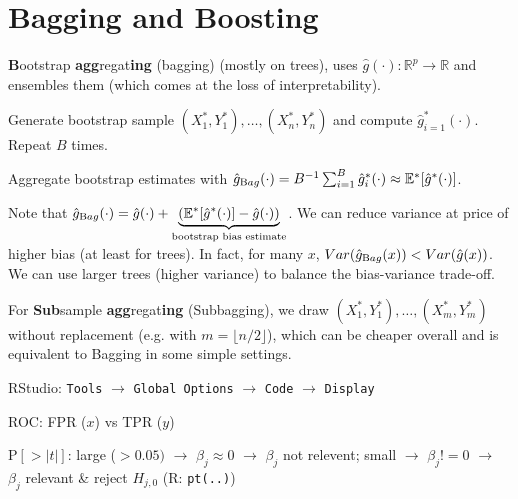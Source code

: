 \section{ Bagging and Boosting}\label{sec:bagging_and_boosting}
\begin{sectionbox}\nospacing{}
  \textbf{B}ootstrap \textbf{agg}regat\textbf{ing} (bagging) (mostly on trees), uses $\hat g(\cdot): \mathbb{R}^{p}\to \mathbb{R}$ and ensembles them (which comes at the loss of interpretability).
  \begin{enumeratenosep}[label=\roman*]
    \item Generate bootstrap sample $(X_{1}^{\ast}, Y_{1}^{\ast}), \dots, (X_{n}^{\ast}, Y_{n}^{\ast})$ and compute $\hat{g}^{\ast}_{i=1}(\cdot)$. Repeat $B$ times.
    \item Aggregate bootstrap estimates with $\hat{g}_{\textrm Bag}(\cdot) = B^{-1}\sum_{i=1}^{B} \hat{g}^{\ast}_{i}(\cdot) \approx \mathbb{E}^{\ast}[\hat{g}^{\ast}(\cdot)]$.
  \end{enumeratenosep}
  Note that $\hat{g}_{\textrm Bag}(\cdot) = \hat{g}(\cdot) + \underbrace{(\mathbb{E}^{\ast}[\hat{g}^{\ast}(\cdot)] -\hat{g}(\cdot))}_{\text{bootstrap bias estimate}}$.
  We can reduce variance at price of higher bias (at least for trees).
  In fact, for many $x$, $Var(\hat{g}_{\textrm Bag}(x)) < Var(\hat{g}(x))$. We can use larger trees (higher variance) to balance the bias-variance trade-off.

  For \textbf{Sub}sample \textbf{agg}regat\textbf{ing} (Subbagging), we draw $(X_{1}^{\ast}, Y_{1}^{\ast}), \dots, (X_{m}^{\ast}, Y_{m}^{\ast})$ without replacement (e.g. with $m = \lfloor n/2\rfloor$), which can be cheaper overall and is equivalent to Bagging in some simple settings.
\end{sectionbox}

\begin{sectionbox}[AdaBoost.M1]\nospacing{}

\end{sectionbox}
\begin{notebox}[Misc]\nospacing{}
  \begin{enumeratenosep}[label=\roman*]
    \item RStudio: \texttt{Tools} $\rightarrow$ \texttt{Global Options} $\rightarrow$ \texttt{Code} $\rightarrow$ \texttt{Display}
    \item ROC: FPR ($x$) vs TPR ($y$)
    \item $\text{P}[>|t|]$: large ($>0.05)$ $\rightarrow$ $\beta_j \approx 0$ $\rightarrow$ $\beta_j$ not relevent; small $\rightarrow$ $\beta_j!=0$ $\rightarrow$ $\beta_j$ relevant \& reject $H_{j,0}$ (R: \texttt{pt(..)})
  \end{enumeratenosep}
\end{notebox}
